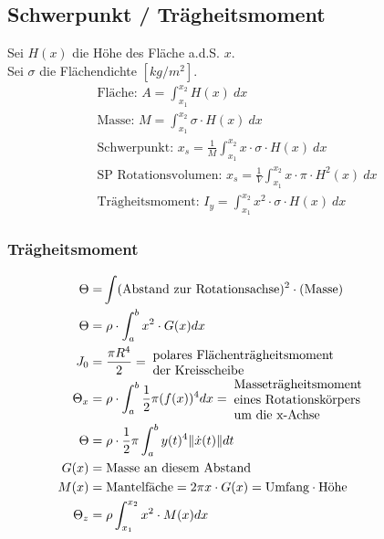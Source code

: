 \subsection{Schwerpunkt / Trägheitsmoment}
    Sei $H(x)$ die Höhe des Fläche a.d.S. $x$.\\
    Sei $\sigma$ die Flächendichte $[kg/m^2]$.
    \begin{align*}
        \textrm{Fläche: }  A = \int_{x_1}^{x_2} H(x)\ dx\\
        \textrm{Masse: }  M = \int_{x_1}^{x_2} \sigma \cdot H(x)\ dx\\
        \textrm{Schwerpunkt: }  x_s = \frac{1}{M} \int_{x_1}^{x_2} x \cdot \sigma \cdot H(x)\ dx\\
        \textrm{SP Rotationsvolumen: } x_s = \frac{1}{V} \int_{x_1}^{x_2} x \cdot \pi \cdot H^2(x)\ dx\\
        \textrm{Trägheitsmoment: }  I_y = \int_{x_1}^{x_2} x^2 \cdot \sigma \cdot H(x)\ dx
    \end{align*}
    \subsubsection{Trägheitsmoment}
    \vspace*{-1em}
        \begin{align*}
            \Theta =& \int (\textrm{Abstand zur Rotationsachse})^2 \cdot (\textrm{Masse})\\
            \Theta =& \; \rho \cdot \int_a^b x^2 \cdot G(x) dx\\
            J_0 =& \; \frac{\pi R^4}{2} = \; \parbox{5cm}{polares Flächenträgheitsmoment\\ der Kreisscheibe}\\
            \Theta_x =& \; \rho \cdot \int_a^b \frac{1}{2} \pi (f(x))^4 dx = \; \parbox{5cm}{Masseträgheitsmoment\\ eines Rotationskörpers\\ um die x-Achse}\\
            \Theta =& \; \rho \cdot \frac{1}{2} \pi \int_a^{b} y(t)^4\|\dot{x}(t)\| dt\\
            G(x) =& \; \text{Masse an diesem Abstand}\\
            M(x) =& \; \text{Mantelfäche} = 2 \pi x \cdot G(x) = \text{Umfang} \cdot \text{Höhe}\\ %
            \Theta_z =& \; \rho \int_{x_1}^{x_2} x^2 \cdot M(x) dx
        \end{align*}        